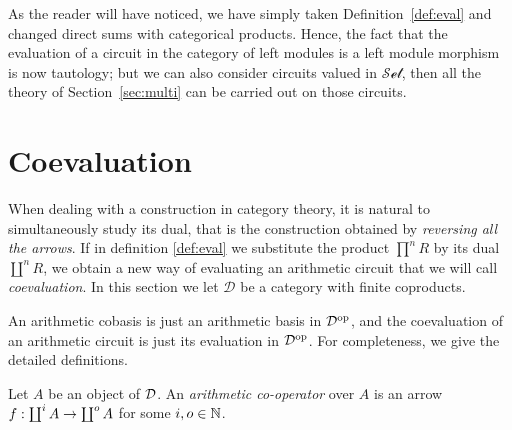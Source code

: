 As the reader will have noticed, we have simply taken
Definition~\ref{def:eval} and changed direct sums with categorical
products. Hence, the fact that the evaluation of a circuit in the
category of left modules is a left module morphism is now tautology;
but we can also consider circuits valued in $\mathscr{Set}$, then all
the theory of Section~\ref{sec:multi} can be carried out on those
circuits.
  


\section{Coevaluation}
When dealing with a construction in category theory, it is natural to
simultaneously study its dual, that is the construction obtained by
\emph{reversing all the arrows}. If in definition \ref{def:eval} we
substitute the product $\prod^nR$ by its dual $\coprod^nR$, we obtain
a new way of evaluating an arithmetic circuit that we will call
\emph{coevaluation}. In this section we let $\mathcal{D}$ be a
category with finite coproducts.

An arithmetic cobasis is just an arithmetic basis in $\mathcal{D}^{\mathrm{op}}$, and the
coevaluation of an arithmetic circuit is just its evaluation in
$\mathcal{D}^{\mathrm{op}}$. For completeness, we give the detailed definitions.

\begin{definition}
  Let $A$ be an object of $\mathcal{D}$.  An \emph{arithmetic co-operator} over
  $A$ is an arrow $f:\coprod^iA\rightarrow\coprod^oA$ for some $i,o\in\mathbb{N}$.
\end{definition}

